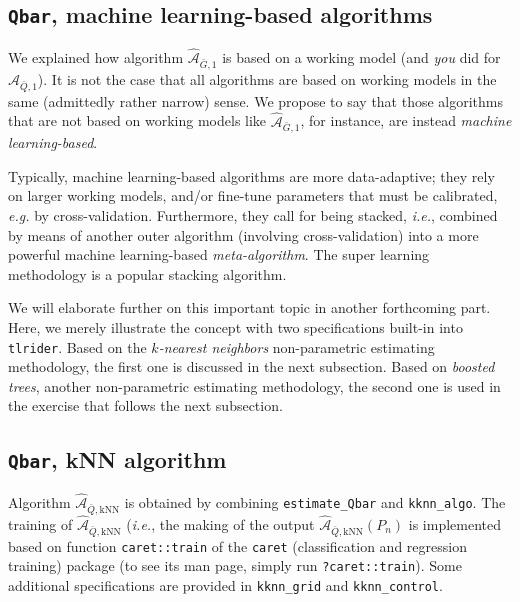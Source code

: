 \documentclass[11pt,openright,twoside]{book}
\newcommand{\Algo}{\widehat{\mathcal{A}}}
\newcommand{\Gbar}{\bar{G}}
\newcommand{\Qbar}{\bar{Q}}
\theoremstyle{definition}
\theoremstyle{definition}
\theoremstyle{definition}
\theoremstyle{remark}
\begin{document}
\hypertarget{qbar-machine-learning-based-algorithms}{%
\subsection{\texorpdfstring{\texttt{Qbar}, machine learning-based algorithms}{Qbar, machine learning-based algorithms}}\label{qbar-machine-learning-based-algorithms}}


We explained how algorithm \(\Algo_{\Gbar,1}\) is based on a working model (and
\emph{you} did for \(\Algo_{\Qbar,1}\)). It is not the case that all algorithms are
based on working models in the same (admittedly rather narrow) sense. We
propose to say that those algorithms that are not based on working models like
\(\Algo_{\Gbar,1}\), for instance, are instead \emph{machine learning-based}.

Typically, machine learning-based algorithms are more data-adaptive; they rely
on larger working models, and/or fine-tune parameters that must be calibrated,
\emph{e.g.} by cross-validation. Furthermore,
they call for being stacked,
\emph{i.e.}, combined by means of another outer algorithm (involving
cross-validation) into a more powerful machine learning-based
\emph{meta-algorithm}. The super
learning methodology is a
popular stacking algorithm.

We will elaborate further on this important topic in another forthcoming part.
Here, we merely illustrate the concept with two specifications built-in into
\texttt{tlrider}. Based on the \emph{\(k\)-nearest neighbors} non-parametric estimating
methodology, the first one is discussed in the next subsection. Based on
\emph{boosted trees}, another non-parametric estimating methodology, the second one
is used in the exercise that follows the next subsection.

\hypertarget{Qbar-knn-algo}{%
\subsection{\texorpdfstring{\texttt{Qbar}, kNN algorithm}{Qbar, kNN algorithm}}\label{Qbar-knn-algo}}

Algorithm \(\Algo_{\Qbar,\text{kNN}}\) is obtained by combining \texttt{estimate\_Qbar}
and \texttt{kknn\_algo}. The training of \(\Algo_{\Qbar,\text{kNN}}\) (\emph{i.e.}, the
making of the output \(\Algo_{\Qbar,\text{kNN}} (P_{n})\) is implemented based
on function \texttt{caret::train} of the \texttt{caret} (classification and regression
training) package (to see its man page, simply run \texttt{?caret::train}). Some
additional specifications are provided in \texttt{kknn\_grid} and \texttt{kknn\_control}.
\end{document}
